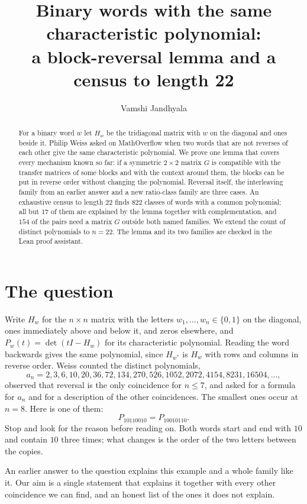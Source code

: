 \documentclass[11pt]{article}
\title{Binary words with the same characteristic polynomial: \\ a block-reversal lemma and a census to length 22}
\author{Vamshi Jandhyala}
\date{}
\theoremstyle{remark}
\begin{document}
\maketitle
\vspace{-2em}

\begin{abstract}
For a binary word $w$ let $H_w$ be the tridiagonal matrix with $w$ on the diagonal and ones beside it. Philip Weiss
asked on MathOverflow when two words that are not reverses of each other give the same characteristic polynomial. We
prove one lemma that covers every mechanism known so far: if a symmetric $2\times2$ matrix $G$ is compatible with the
transfer matrices of some blocks and with the context around them, the blocks can be put in reverse order without
changing the polynomial. Reversal itself, the interleaving family from an earlier answer and a new ratio-class family
are three cases. An exhaustive census to length $22$ finds $822$ classes of words with a common polynomial; all but
$17$ of them are explained by the lemma together with complementation, and $154$ of the pairs need a matrix $G$
outside both named families. We extend the count of distinct polynomials to $n=22$. The lemma and its two families
are checked in the Lean proof assistant.
\end{abstract}

\section{The question}

Write $H_w$ for the $n\times n$ matrix with the letters $w_1,\dots,w_n\in\{0,1\}$ on the diagonal, ones immediately
above and below it, and zeros elsewhere, and $P_w(t)=\det(tI-H_w)$ for its characteristic polynomial. Reading the
word backwards gives the same polynomial, since $H_{w^*}$ is $H_w$ with rows and columns in reverse order. Weiss
\cite{MO} counted the distinct polynomials,
\[
a_n=2,3,6,10,20,36,72,134,270,526,1052,2072,4154,8231,16504,\dots,
\]
observed that reversal is the only coincidence for $n\le7$, and asked for a formula for $a_n$ and for a description of
the other coincidences. The smallest ones occur at $n=8$. Here is one of them:
\[
P_{10110010}=P_{10010110}.
\]
Stop and look for the reason before reading on. Both words start and end with $10$ and contain $10$ three times; what
changes is the order of the two letters between the copies.

An earlier answer to the question \cite{MOans} explains this example and a whole family like it. Our aim is a single
statement that explains it together with every other coincidence we can find, and an honest list of the ones it does
not explain.
\end{document}

